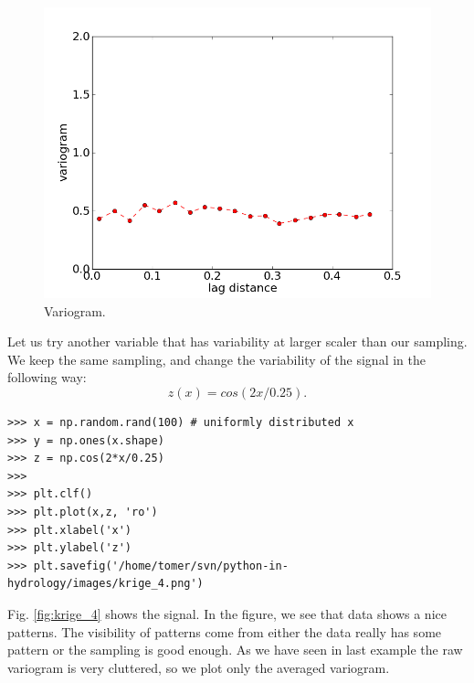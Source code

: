 \documentclass[10pt]{book}
\begin{document}
\beforefig
\begin{figure}[!h]
  \centering
    \includegraphics[scale=0.5]{images/krige_3.png}
  \caption{Variogram.}
   \label{fig:krige_3}
\end{figure}
\afterfig

Let us try another variable that has variability at larger scaler than our sampling. We keep the same sampling, and change the variability of the signal in the following way:
\begin{equation}
z(x) = cos(2 x/0.25).
\end{equation}

\beforeverb \begin{verbatim}
>>> x = np.random.rand(100) # uniformly distributed x
>>> y = np.ones(x.shape) 
>>> z = np.cos(2*x/0.25) 
>>> 
>>> plt.clf()
>>> plt.plot(x,z, 'ro')
>>> plt.xlabel('x')
>>> plt.ylabel('z')
>>> plt.savefig('/home/tomer/svn/python-in-hydrology/images/krige_4.png')
\end{verbatim} \afterverb

Fig. \ref{fig:krige_4} shows the signal. In the figure, we see that data shows a nice patterns. The visibility of patterns come from either the data really has some pattern or the sampling is good enough. As we have seen in last example the raw variogram is very cluttered, so we plot only the averaged variogram. 
\end{document}

